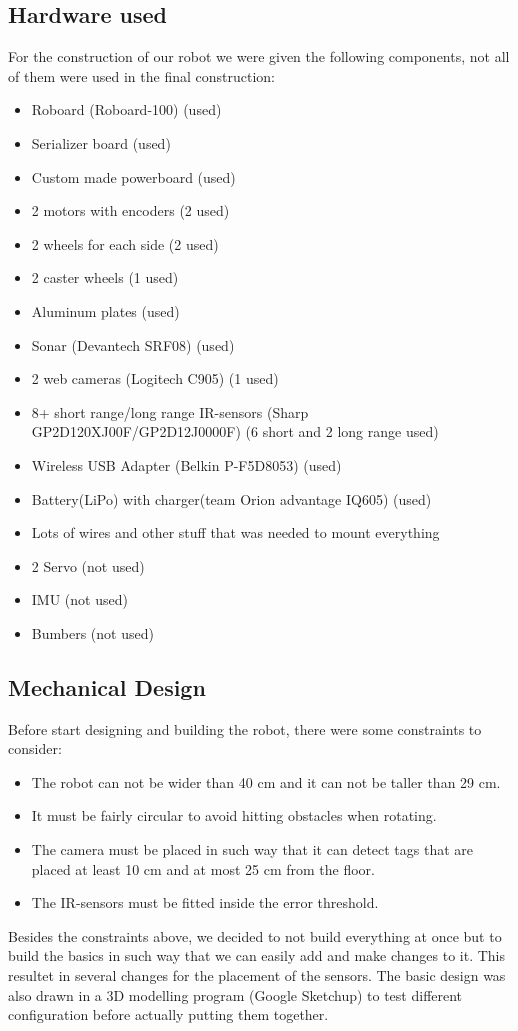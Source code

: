 \subsection{Hardware used}

For the construction of our robot we were given the following components, not all of them were used in the final construction:
\begin{itemize}
\item Roboard (Roboard-100) (used)
\item Serializer board (used)
\item Custom made powerboard (used)
\item 2 motors with encoders (2 used)
\item 2 wheels for each side (2 used)
\item 2 caster wheels (1 used)
\item Aluminum plates (used)
\item Sonar (Devantech SRF08) (used)
\item 2 web cameras (Logitech C905) (1 used)
\item 8+ short range/long range IR-sensors (Sharp GP2D120XJ00F/GP2D12J0000F) (6 short and 2 long range used)
\item Wireless USB Adapter (Belkin P-F5D8053) (used)
\item Battery(LiPo) with charger(team Orion advantage IQ605) (used)
\item Lots of wires and other stuff that was needed to mount everything
\item 2 Servo (not used)
\item IMU (not used)
\item Bumbers (not used)
\end{itemize}


\subsection{Mechanical Design}

Before start designing and building the robot, there were some constraints to consider:
\begin{itemize}
\item The robot can not be wider than 40 cm and it can not be taller than 29 cm.
\item It must be fairly circular to avoid hitting obstacles when rotating.
\item The camera must be placed in such way that it can detect tags that are placed at least 10 cm and at most 25 cm from the floor.
\item The IR-sensors must be fitted inside the error threshold.
\end{itemize}
Besides the constraints above, we decided to not build everything at once but to build the basics in such way that we can easily add and make changes to it. This resultet in several changes for the placement of the sensors.
The basic design was also drawn in a 3D modelling program (Google Sketchup) to test different configuration before actually putting them together.

